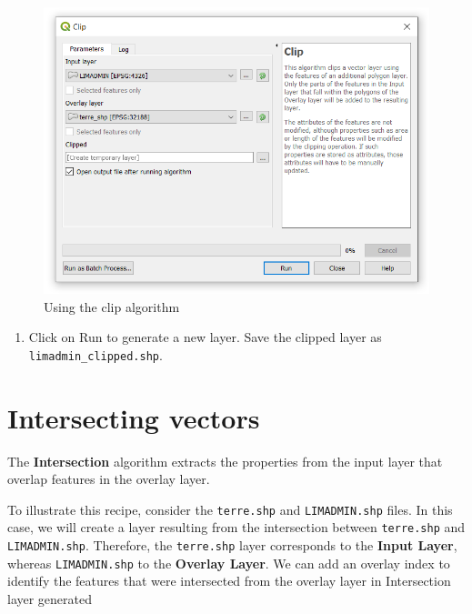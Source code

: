 \documentclass[]{book}
\providecommand{\tightlist}{%
  \setlength{\itemsep}{0pt}\setlength{\parskip}{0pt}}
\theoremstyle{definition}
\theoremstyle{definition}
\theoremstyle{definition}
\theoremstyle{remark}
\begin{document}
\begin{figure}

{\centering \includegraphics[width=10.6in]{figures/Clipping_Vectors_Dialog} 

}

\caption{Using the clip algorithm}\label{fig:unnamed-chunk-20}
\end{figure}

\begin{enumerate}
\def\labelenumi{\arabic{enumi}.}
\setcounter{enumi}{3}
\tightlist
\item
  Click on Run to generate a new layer. Save the clipped layer as
  \texttt{limadmin\_clipped.shp}.
\end{enumerate}

\section{Intersecting vectors}\label{intersecting-vectors}

The \textbf{Intersection} algorithm extracts the properties from the
input layer that overlap features in the overlay layer.

To illustrate this recipe, consider the \texttt{terre.shp} and
\texttt{LIMADMIN.shp} files. In this case, we will create a layer
resulting from the intersection between \texttt{terre.shp} and
\texttt{LIMADMIN.shp}. Therefore, the \texttt{terre.shp} layer
corresponds to the \textbf{Input Layer}, whereas \texttt{LIMADMIN.shp}
to the \textbf{Overlay Layer}. We can add an overlay index to identify
the features that were intersected from the overlay layer in
Intersection layer generated
\end{document}
